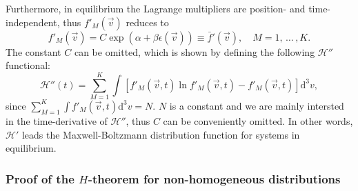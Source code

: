 Furthermore, in equilibrium the Lagrange multipliers are position- and time-independent,
thus $f'_M(\vec{v})$
reduces to
%
\begin{equation}\label{eq:fbardef}
    f'_M(\vec{v})=C\exp\left(\alpha+\beta \epsilon(\vec{v})\right)
    \equiv \bar{f}'(\vec{v}),\quad M=1,\,\dots\,,K.
\end{equation} 
%
The constant $C$ can be omitted, which is shown by defining the following $\mathcal{H}''$
functional:
%
\begin{equation}
   \mathcal{H}''(t)=\sum_{M=1}^{K}\int \left[f'_M(\vec{v},t)
    \ln f'_M(\vec{v},t)-f'_M(\vec{v},t)\right]\mathrm{d}^3v  \label{CH3},
\end{equation}
%
since $\sum_{M=1}^{K} \int f'_M(\vec{v},t)\mathrm{d}^3v =N$.
$N$ is a constant and we are mainly intersted in the time-derivative of $\mathcal{H}''$, thus
$C$ can be conveniently omitted. In other words, $\mathcal{H}'$ leads the Maxwell-Boltzmann
distribution function for systems in equilibrium.

\subsubsection{Proof of the $H$-theorem for non-homogeneous distributions}

